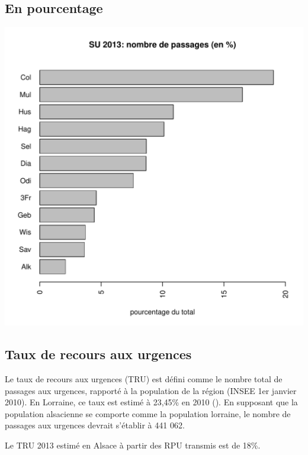 \documentclass[12pt,english,french,twoside]{book}\usepackage[]{graphicx}\usepackage[]{color}
\makeatletter
\def\maxwidth{ %
  \ifdim\Gin@nat@width>\linewidth
    \linewidth
  \else
    \Gin@nat@width
  \fi
}
\newenvironment{knitrout}{}{} %
\makeatother
\begin{document}
\subsection*{En pourcentage}
\begin{knitrout}
\color{fgcolor}
\includegraphics[width=\maxwidth]{figure/en_pourcentage} 

\end{knitrout}


\subsection*{Taux de recours aux urgences}



Le taux de recours aux urgences  (TRU)  est défini comme le nombre total de passages aux urgences, rapporté à la population de la région (INSEE 1er janvier 2010). En Lorraine, ce taux est estimé à 23,45\% en 2010 (\cite{2,3}). En supposant que la population alsacienne se comporte comme la population lorraine, le nombre de passages aux urgences devrait s'établir à 441 062.

Le TRU 2013 estimé en Alsace à partir des RPU transmis est de 18\%.
\end{document}
